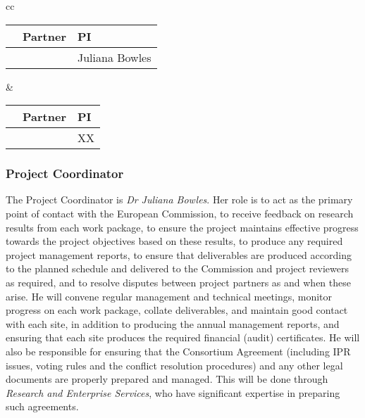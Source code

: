 \documentclass[a4paper,11pt]{article}
\begin{document}
\begin{center}
\begin{tabular}{cc}
\begin{tabular}{|l|l|l|}\hline
& \textbf{Partner} & \textbf{PI} \\ \hline
\addtocounter{partic}{1}
\thepartic & \participantshort{\thepartic} &  Juliana Bowles \\\hline
\end{tabular}
\quad\quad&\quad\quad
\begin{tabular}{|l|l|l|}\hline
& \textbf{Partner} & \textbf{PI} \\ \hline
\addtocounter{partic}{1}
\thepartic & \participantshort{\thepartic} & XX \\\hline
\end{tabular}
\end{tabular}
\end{center}

\vspace{12pt}
\subsubsection*{Project Coordinator}
\vspace{-6pt}

The Project Coordinator is \emph{Dr Juliana Bowles}.  Her role
is to act as the primary point of contact with the European
Commission, to receive feedback on research results from each
work package, to ensure the project maintains effective
progress towards the project objectives based on these results,
to produce any required  project management reports, to ensure
that deliverables are produced according to the planned
schedule and delivered to the Commission and project reviewers
as required, and to resolve disputes between project partners
as and when these arise.  He will convene regular management
and technical meetings, monitor progress on each work package,
collate deliverables, and maintain good contact with each site,
in addition to producing the annual management reports, and
ensuring that each site produces the required financial (audit)
certificates.  He will also be responsible for ensuring that
the Consortium Agreement (including IPR issues, voting rules and the conflict resolution procedures)
and any other legal documents are properly prepared and managed. This will be
done through \SAshort{} \emph{Research and Enterprise
Services}, who have significant expertise in preparing such
agreements.

\vspace{12pt}
\end{document}
